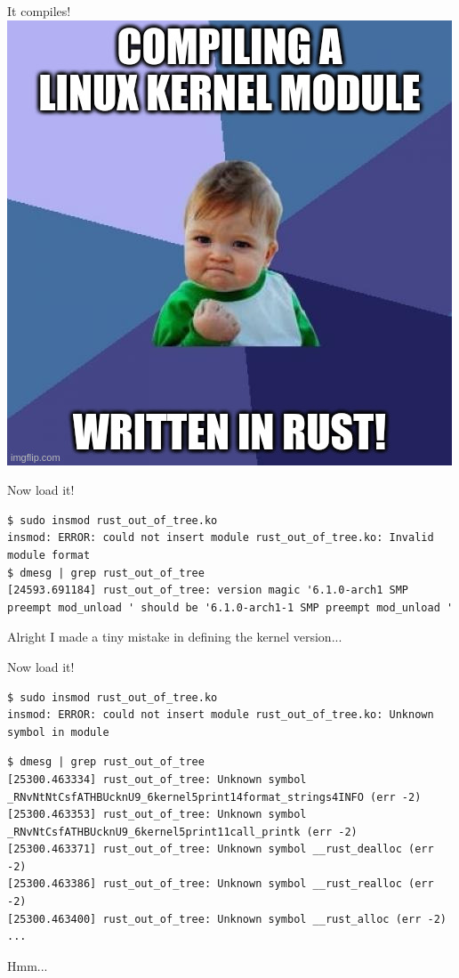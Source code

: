 \begin{frame}[c]{It compiles!}
  \centering
  \includegraphics[height=0.8\textheight]{img/compiling-linux-kernel-module-in-rust.jpg}
\end{frame}

\begin{frame}[c,fragile]{Now load it!}
\begin{verbatim}
$ sudo insmod rust_out_of_tree.ko
insmod: ERROR: could not insert module rust_out_of_tree.ko: Invalid module format
$ dmesg | grep rust_out_of_tree
[24593.691184] rust_out_of_tree: version magic '6.1.0-arch1 SMP preempt mod_unload ' should be '6.1.0-arch1-1 SMP preempt mod_unload '
\end{verbatim}
\pause Alright I made a tiny mistake in defining the kernel version...
\end{frame}

\begin{frame}[c,fragile]{Now load it!}
\begin{verbatim}
$ sudo insmod rust_out_of_tree.ko
insmod: ERROR: could not insert module rust_out_of_tree.ko: Unknown symbol in module
\end{verbatim}
\begin{verbatim}
$ dmesg | grep rust_out_of_tree
[25300.463334] rust_out_of_tree: Unknown symbol _RNvNtNtCsfATHBUcknU9_6kernel5print14format_strings4INFO (err -2)
[25300.463353] rust_out_of_tree: Unknown symbol _RNvNtCsfATHBUcknU9_6kernel5print11call_printk (err -2)
[25300.463371] rust_out_of_tree: Unknown symbol __rust_dealloc (err -2)
[25300.463386] rust_out_of_tree: Unknown symbol __rust_realloc (err -2)
[25300.463400] rust_out_of_tree: Unknown symbol __rust_alloc (err -2)
...
\end{verbatim}
\pause Hmm...
\end{frame}

